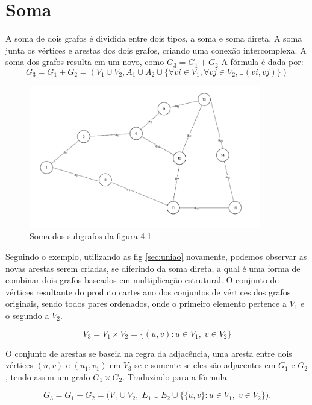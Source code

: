 \documentclass[
12pt,
a4paper,
semrecuonosumario,
sumario = abnt-6027-2012]{report}
\begin{document}
	\section{Soma}\label{sec:soma}
    A soma de dois grafos é dividida entre dois tipos, a soma e soma direta.
    A soma junta os vértices e arestas dos dois grafos, criando uma conexão intercomplexa. A soma dos grafos resulta em um novo, como $G_3 = G_1 + G_2$ A fórmula é dada por:
    \[
    G_3 = G_1 + G_2 = (V_1 \cup V_2, A_1 \cup A_2 \cup \{ \forall vi \in V_1, \forall vj \in V_2, \exists(vi, vj) \})
    \]

    \begin{figure}[!h]
        \centering
        \includegraphics[width=0.9\textwidth]{figuras/subgrafos/subgrafo_soma.png}
        \caption{Soma dos subgrafos da figura 4.1}
            \label{fig:somaGrafos}
    \end{figure}

    Seguindo o exemplo, utilizando as fig \ref{sec:uniao} novamente, podemos observar as novas arestas serem criadas, se diferindo da soma direta, a qual é uma forma de combinar dois grafos baseados em multiplicação estrutural. O conjunto de vértices resultante do produto cartesiano dos conjuntos de vértices dos grafos originais, sendo todos pares ordenados, onde o primeiro elemento pertence a $V_1$ e o segundo a $V_2$.

    \[
    V_3 = V_1 \times V_2 = \{(u,v):u\in V_1,\; v\in V_2\}
    \]

    O conjunto de arestas se baseia na regra da adjacência, uma aresta entre dois vértices $(u, v)$ e $(u_1, v_1)$ em $V_3$ se e somente se eles são adjacentes em $G_1$ e $G_2$, tendo assim um grafo  $G_1 \times G_2$. Traduzindo para a fórmula:

    \[ %
    G_3 = G_1+G_2=\big(V_1\cup V_2,\;E_1\cup E_2\cup \{\{u,v\}:u\in V_1,\; v\in V_2\}\big).
    \]
\end{document}
